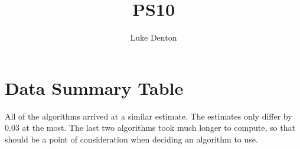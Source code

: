 \documentclass{homework}
\title{PS10}
\author{Luke Denton}
\begin{document}
\maketitle

\section{Data Summary Table}
\begin{table}[h]
\centering
\hspace*{-1.65cm}
\end{table}
All of the algorithms arrived at a similar estimate. The estimates only differ by 0.03 at the most. The last two algorithms took much longer to compute, so that should be a point of consideration when deciding an algorithm to use.
\end{document}
